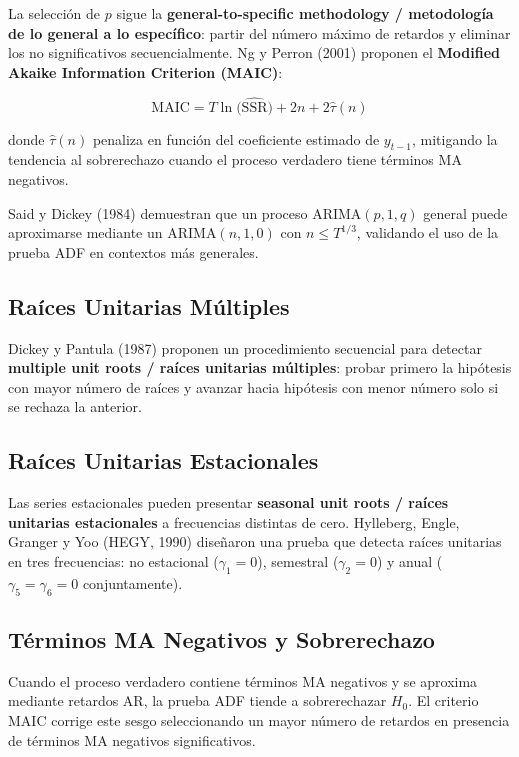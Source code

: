 \documentclass[12pt]{article}
\begin{document}
La selecci\'on de $p$ sigue la \textbf{general-to-specific methodology /
metodolog\'ia de lo general a lo espec\'ifico}: partir del n\'umero m\'aximo
de retardos y eliminar los no significativos secuencialmente.
Ng y Perron (2001) proponen el \textbf{Modified Akaike Information
Criterion (MAIC)}:

\begin{equation}
  \mathrm{MAIC} = T\ln\!\bigl(\widehat{\mathrm{SSR}}\bigr)
                  + 2n + 2\hat{\tau}(n)
\end{equation}

donde $\hat{\tau}(n)$ penaliza en funci\'on del coeficiente estimado de
$y_{t-1}$, mitigando la tendencia al sobrerechazo cuando el proceso
verdadero tiene t\'erminos MA negativos.

Said y Dickey (1984) demuestran que un proceso ARIMA$(p,1,q)$ general
puede aproximarse mediante un ARIMA$(n,1,0)$ con $n \leq T^{1/3}$,
validando el uso de la prueba ADF en contextos m\'as generales.

\subsection{Ra\'ices Unitarias M\'ultiples}

Dickey y Pantula (1987) proponen un procedimiento secuencial para detectar
\textbf{multiple unit roots / ra\'ices unitarias m\'ultiples}: probar
primero la hip\'otesis con mayor n\'umero de ra\'ices y avanzar hacia
hip\'otesis con menor n\'umero solo si se rechaza la anterior.

\subsection{Ra\'ices Unitarias Estacionales}

Las series estacionales pueden presentar \textbf{seasonal unit roots /
ra\'ices unitarias estacionales} a frecuencias distintas de cero.
Hylleberg, Engle, Granger y Yoo (HEGY, 1990) dise\~naron una prueba que
detecta ra\'ices unitarias en tres frecuencias: no estacional
($\gamma_1 = 0$), semestral ($\gamma_2 = 0$) y anual
($\gamma_5 = \gamma_6 = 0$ conjuntamente).

\subsection{T\'erminos MA Negativos y Sobrerechazo}

Cuando el proceso verdadero contiene t\'erminos MA negativos y se aproxima
mediante retardos AR, la prueba ADF tiende a sobrerechazar $H_0$. El
criterio MAIC corrige este sesgo seleccionando un mayor n\'umero de
retardos en presencia de t\'erminos MA negativos significativos.
\end{document}
